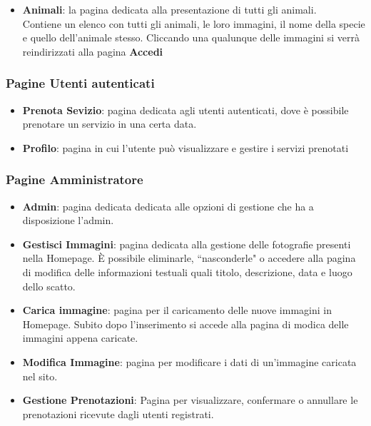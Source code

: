 \begin{itemize}
    \begin{itemize}
        \item Safari - un giro nel parco con navetta o con la propria macchina;
        \item Ingresso - un ingresso libero, a piedi, nelle zone recintate del parco;
        \item Visita guidata - un ingresso a piedi nel parco, accompagnato da una guida dedicata al gruppo dell'utente;
    \end{itemize}
    Tutti i servizi sono corredati da un pulsante che conduce l'utente autenticato nella pagina di prenotazione, e l'utente non autenticato nella pagina di login (a seguito del quale l'utnete verrà poi reindirizzato nella pagina di prenotazione).\\
    Le immagini che affiancano ciascun servizio sono in questo caso immagini non di contenuto, e sono pertanto state inserite come immagini di sfondo, non esplorabili mediante screen reader.
    \item \textbf{Animali}: la pagina dedicata alla presentazione di tutti gli animali.\\
    Contiene un elenco con tutti gli animali, le loro immagini, il nome della specie e quello dell'animale stesso. Cliccando una qualunque delle immagini si verrà reindirizzati alla
    pagina \textbf{Accedi}
\end{itemize}
\subsubsection{Pagine Utenti autenticati}
\begin{itemize}
\item \textbf{Prenota Sevizio}: pagina dedicata agli utenti autenticati, dove \`e possibile prenotare un servizio in una certa data.
\item \textbf{Profilo}: pagina in cui l'utente può visualizzare e gestire i servizi prenotati
\end{itemize}
\subsubsection{Pagine Amministratore}
\begin{itemize}
\item \textbf{Admin}: pagina dedicata dedicata alle opzioni di gestione che ha a disposizione l'admin.
\item \textbf{Gestisci Immagini}: pagina dedicata alla gestione delle fotografie presenti nella Homepage. \`E possibile eliminarle,
 ``nasconderle" o accedere alla pagina di modifica delle informazioni testuali quali titolo, descrizione, data e luogo dello scatto.
\item \textbf{Carica immagine}: pagina per il caricamento delle nuove immagini in Homepage. Subito dopo l'inserimento 
si accede alla pagina di modica delle immagini appena caricate.
\item \textbf{Modifica Immagine}: pagina per modificare i dati di un'immagine caricata nel sito.
\item \textbf{Gestione Prenotazioni}: Pagina per visualizzare, confermare o annullare le prenotazioni ricevute dagli utenti registrati.
\end{itemize}
